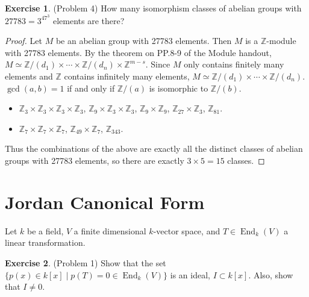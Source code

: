 \documentclass[12pt, psamsfonts]{amsart}
\theoremstyle{definition}
\newtheorem*{exer}{Exercise}
\theoremstyle{remark}
\DeclareMathOperator{\End}{End}
\numberwithin{equation}{section}
\begin{document}
\begin{exer}{(Problem 4)}
  How many isomorphism classes of abelian groups with $27783 = 3^47^3$ elements are there?
\end{exer}

\begin{proof}
  Let $M$ be an abelian group with 27783 elements.
  Then $M$ is a $\mathbb{Z}$-module with 27783 elements.
  By the theorem on PP.8-9 of the Module handout, $M \simeq \mathbb{Z}/(d_1) \times \cdots \times \mathbb{Z}/(d_n) \times \mathbb{Z}^{m - s}$.
  Since $M$ only contains finitely many elements and $\mathbb{Z}$ contains infinitely many elements, $M \simeq \mathbb{Z}/(d_1) \times \cdots \times \mathbb{Z}/(d_n)$.
  $\gcd(a, b) = 1$ if and only if $\mathbb{Z}/(a)$ is isomorphic to $\mathbb{Z}/(b)$.
  \begin{itemize}
    \item
      $\mathbb{Z}_3 \times \mathbb{Z}_3 \times \mathbb{Z}_3 \times \mathbb{Z}_3$, $\mathbb{Z}_9 \times \mathbb{Z}_3 \times \mathbb{Z}_3$,
      $\mathbb{Z}_9 \times \mathbb{Z}_9$, $\mathbb{Z}_{27} \times \mathbb{Z}_3$, $\mathbb{Z}_{81}$.
    \item
      $\mathbb{Z}_7 \times \mathbb{Z}_7 \times \mathbb{Z}_7$, $\mathbb{Z}_{49} \times \mathbb{Z}_7$, $\mathbb{Z}_{343}$.
  \end{itemize}
  Thus the combinations of the above are exactly all the distinct classes of abelian groups with 27783 elements, so there are exactly $3 \times 5 = 15$ classes.
\end{proof}

\section{Jordan Canonical Form}

Let $k$ be a field, $V$ a finite dimensional $k$-vector space, and $T \in \End_k(V)$ a linear transformation.

\begin{exer}{(Problem 1)}
  Show that the set $\{ p(x) \in k[x] \mid p(T) = 0 \in \End_k(V) \}$ is an ideal, $I \subset k[x]$.
  Also, show that $I \ne 0$.
\end{exer}
\end{document}
